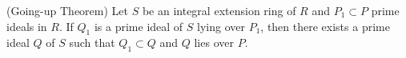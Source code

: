(Going-up Theorem) Let $S$ be an integral extension ring of $R$ and $P_1 \subset P$ prime ideals in $R$. If $Q_1$ is a prime ideal of $S$ lying over $P_1$, then there exists a prime ideal $Q$ of $S$ such that $Q_1 \subset Q$ and $Q$ lies over $P$.
